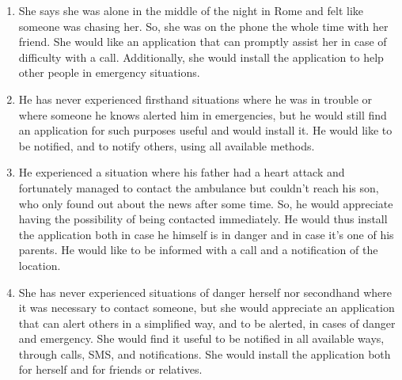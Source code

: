 \documentclass[12pt]{article}
\begin{document}
\begin{enumerate}
    \item She says she was alone in the middle of the night in Rome and felt like someone was chasing her. So, she was on the phone the whole time with her friend. She would like an application that can promptly assist her in case of difficulty with a call. Additionally, she would install the application to help other people in emergency situations.
    
    \item He has never experienced firsthand situations where he was in trouble or where someone he knows alerted him in emergencies, but he would still find an application for such purposes useful and would install it. He would like to be notified, and to notify others, using all available methods.
    
    \item He experienced a situation where his father had a heart attack and fortunately managed to contact the ambulance but couldn't reach his son, who only found out about the news after some time. So, he would appreciate having the possibility of being contacted immediately. He would thus install the application both in case he himself is in danger and in case it's one of his parents. He would like to be informed with a call and a notification of the location.
    
    \item She has never experienced situations of danger herself nor secondhand where it was necessary to contact someone, but she would appreciate an application that can alert others in a simplified way, and to be alerted, in cases of danger and emergency. She would find it useful to be notified in all available ways, through calls, SMS, and notifications. She would install the application both for herself and for friends or relatives.
\end{enumerate}
\end{document}
